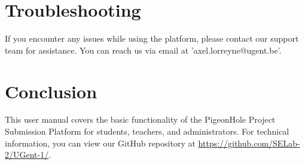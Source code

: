 \documentclass{article}
\begin{document}
\section{Troubleshooting}
If you encounter any issues while using the platform, please contact our support team for assistance. You can reach us via email at 'axel.lorreyne@ugent.be'.

\section{Conclusion}
This user manual covers the basic functionality of the PigeonHole Project Submission Platform for students, teachers, and administrators. For technical information, you can view our GitHub repository at \url{https://github.com/SELab-2/UGent-1/}.
\end{document}
